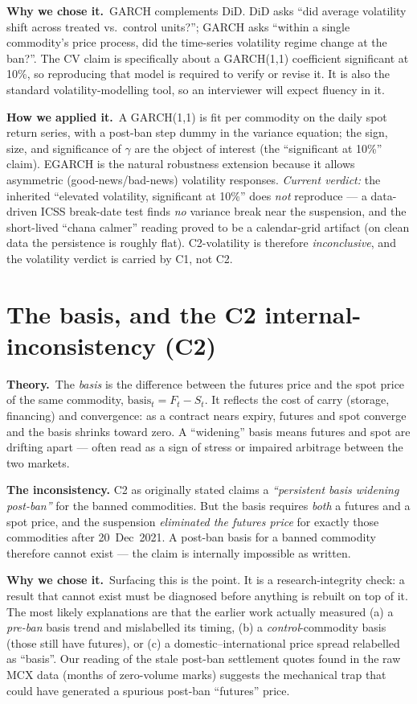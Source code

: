 \documentclass[11pt]{article}
\newcommand{\why}{\smallskip\noindent\textbf{Why we chose it.}\ }
\newcommand{\how}{\smallskip\noindent\textbf{How we applied it.}\ }
\newcommand{\thy}{\noindent\textbf{Theory.}\ }
\begin{document}
\why GARCH complements DiD. DiD asks ``did average volatility shift across treated vs.\
control units?''; GARCH asks ``within a single commodity's price process, did the
time-series volatility regime change at the ban?''. The CV claim is specifically about a
GARCH(1,1) coefficient significant at 10\%, so reproducing that model is required to verify
or revise it. It is also the standard volatility-modelling tool, so an interviewer will
expect fluency in it.

\how A GARCH(1,1) is fit per commodity on the daily spot return series, with a post-ban step
dummy in the variance equation; the sign, size, and significance of $\gamma$ are the object
of interest (the ``significant at 10\%'' claim). EGARCH is the natural robustness extension
because it allows asymmetric (good-news/bad-news) volatility responses. \emph{Current verdict:}
the inherited ``elevated volatility, significant at 10\%'' does \emph{not} reproduce --- a
data-driven ICSS break-date test finds \emph{no} variance break near the suspension, and the
short-lived ``chana calmer'' reading proved to be a calendar-grid artifact (on clean data the
persistence is roughly flat). C2-volatility is therefore \emph{inconclusive}, and the
volatility verdict is carried by C1, not C2.

\section{The basis, and the C2 internal-inconsistency (C2)}
\thy The \emph{basis} is the difference between the futures price and the spot price of the
same commodity, $\text{basis}_t = F_t - S_t$. It reflects the cost of carry (storage,
financing) and convergence: as a contract nears expiry, futures and spot converge and the
basis shrinks toward zero. A ``widening'' basis means futures and spot are drifting apart ---
often read as a sign of stress or impaired arbitrage between the two markets.

\smallskip\noindent\textbf{The inconsistency.} C2 as originally stated claims a
\emph{``persistent basis widening post-ban''} for the banned commodities. But the basis
requires \emph{both} a futures and a spot price, and the suspension \emph{eliminated the
futures price} for exactly those commodities after 20~Dec~2021. A post-ban basis for a
banned commodity therefore cannot exist --- the claim is internally impossible as written.

\why Surfacing this is the point. It is a research-integrity check: a result that cannot
exist must be diagnosed before anything is rebuilt on top of it. The most likely
explanations are that the earlier work actually measured (a) a \emph{pre-ban} basis trend
and mislabelled its timing, (b) a \emph{control}-commodity basis (those still have futures),
or (c) a domestic--international price spread relabelled as ``basis''. Our reading of the
stale post-ban settlement quotes found in the raw MCX data (months of zero-volume marks)
suggests the mechanical trap that could have generated a spurious post-ban ``futures'' price.
\end{document}
